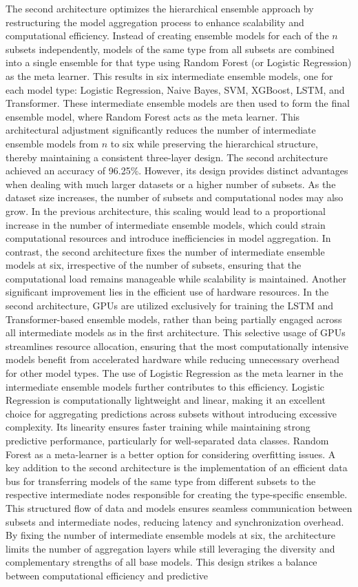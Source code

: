 \noindent
The second architecture optimizes the hierarchical ensemble approach by restructuring the model aggregation process to enhance scalability and computational efficiency. Instead of creating ensemble models for each of the $n$ subsets independently, models of the same type from all subsets are combined into a single ensemble for that type using Random Forest (or Logistic Regression) as the meta learner. This results in six intermediate ensemble models, one for each model type: Logistic Regression, Naive Bayes, SVM, XGBoost, LSTM, and Transformer. These intermediate ensemble models are then used to form the final ensemble model, where Random Forest acts as the meta learner. This architectural adjustment significantly reduces the number of intermediate ensemble models from $n$ to six while preserving the hierarchical structure, thereby maintaining a consistent three-layer design. The second architecture achieved an accuracy of 96.25\%. However, its design provides distinct advantages when dealing with much larger datasets or a higher number of subsets. As the dataset size increases, the number of subsets and computational nodes may also grow. In the previous architecture, this scaling would lead to a proportional increase in the number of intermediate ensemble models, which could strain computational resources and introduce inefficiencies in model aggregation. In contrast, the second architecture fixes the number of intermediate ensemble models at six, irrespective of the number of subsets, ensuring that the computational load remains manageable while scalability is maintained. Another significant improvement lies in the efficient use of hardware resources. In the second architecture, GPUs are utilized exclusively for training the LSTM and Transformer-based ensemble models, rather than being partially engaged across all intermediate models as in the first architecture. This selective usage of GPUs streamlines resource allocation, ensuring that the most computationally intensive models benefit from accelerated hardware while reducing unnecessary overhead for other model types. The use of Logistic Regression as the meta learner in the intermediate ensemble models further contributes to this efficiency. Logistic Regression is computationally lightweight and linear, making it an excellent choice for aggregating predictions across subsets without introducing excessive complexity. Its linearity ensures faster training while maintaining strong predictive performance, particularly for well-separated data classes. Random Forest as a meta-learner is a better option for considering overfitting issues. A key addition to the second architecture is the implementation of an efficient data bus for transferring models of the same type from different subsets to the respective intermediate nodes responsible for creating the type-specific ensemble. This structured flow of data and models ensures seamless communication between subsets and intermediate nodes, reducing latency and synchronization overhead. By fixing the number of intermediate ensemble models at six, the architecture limits the number of aggregation layers while still leveraging the diversity and complementary strengths of all base models. This design strikes a balance between computational efficiency and predictive 